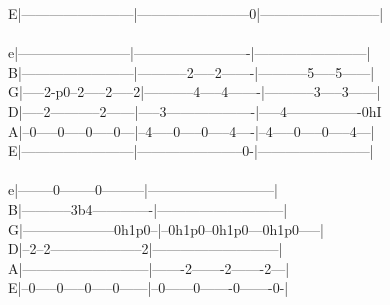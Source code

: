 {E|------------------------|------------------------0|--------------------------|\\
\\
e|------------------------|-------------------------|------------------------|\\
B|------------------------|-----------2-----2-------|-----------5-----5------|\\
G|-----2-p0--2-----2-----2|-----------4-----4-------|-----------3-----3------|\\
D|-----2-----------2------|-----3-------------------|-----4----------------0hI\\
A|--0-----0-----0-----0---|--4-----0-----0-----4----|--4-----0-----0-----4---|\\
E|------------------------|-----------------------0-|------------------------|\\
\\
e|--------0--------0---------|---------------------------|\\
B|-----------3b4-------------|---------------------------|\\
G|--------------------0h1p0--|--0h1p0--0h1p0---0h1p0-----|\\
D|--2--2--------------------2|---------------------------|\\
A|---------------------------|-------2-------2-------2---|\\
E|--0-----0-----0-----0------|--0------0-------0-------0-|\\}
